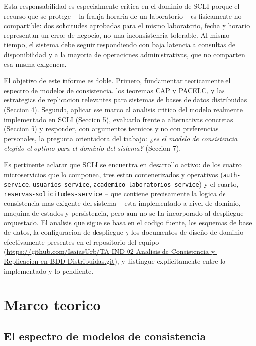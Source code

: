 \documentclass[11pt,a4paper]{article}
\newcommand{\repoPFC}{\url{https://github.com/IsaiasUrb/TA-IND-02-Analisis-de-Consistencia-y-Replicacion-en-BDD-Distribuidas.git}}
\begin{document}
Esta responsabilidad es especialmente critica en el dominio de SCLI porque el recurso que se protege -- la franja horaria de un laboratorio -- es fisicamente no compartible: dos solicitudes aprobadas para el mismo laboratorio, fecha y horario representan un error de negocio, no una inconsistencia tolerable. Al mismo tiempo, el sistema debe seguir respondiendo con baja latencia a consultas de disponibilidad y a la mayoria de operaciones administrativas, que no comparten esa misma exigencia.

El objetivo de este informe es doble. Primero, fundamentar teoricamente el espectro de modelos de consistencia, los teoremas CAP y PACELC, y las estrategias de replicacion relevantes para sistemas de bases de datos distribuidas (Seccion 4). Segundo, aplicar ese marco al analisis critico del modelo realmente implementado en SCLI (Seccion 5), evaluarlo frente a alternativas concretas (Seccion 6) y responder, con argumentos tecnicos y no con preferencias personales, la pregunta orientadora del trabajo: \emph{¿es el modelo de consistencia elegido el optimo para el dominio del sistema?} (Seccion 7).

Es pertinente aclarar que SCLI se encuentra en desarrollo activo: de los cuatro microservicios que lo componen, tres estan contenerizados y operativos (\texttt{auth-service}, \texttt{usuarios-service}, \texttt{academico-laboratorios-service}) y el cuarto, \texttt{reservas-solicitudes-service} -- que contiene precisamente la logica de consistencia mas exigente del sistema -- esta implementado a nivel de dominio, maquina de estados y persistencia, pero aun no se ha incorporado al despliegue orquestado. El analisis que sigue se basa en el codigo fuente, los esquemas de base de datos, la configuracion de despliegue y los documentos de diseño de dominio efectivamente presentes en el repositorio del equipo (\repoPFC), y distingue explicitamente entre lo implementado y lo pendiente.

\section{Marco teorico}

\subsection{El espectro de modelos de consistencia}
\end{document}
